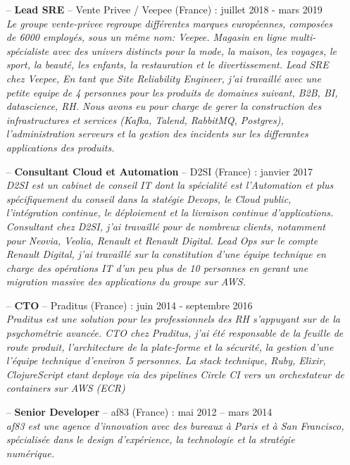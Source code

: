 \documentclass[a4paper,11pt]{article}
\begin{document}
  \begin{itemize}
    \item[--]
      \textbf{Lead SRE} – Vente Privee / Veepee (France) : juillet 2018 - mars 2019\\
      \textit{Le groupe vente-privee regroupe différentes marques européennes, composées de 6000 employés, sous un même nom: Veepee. Magasin en ligne multi-spécialiste avec des univers distincts pour la mode, la maison, les voyages, le sport, la beauté, les enfants, la restauration et le divertissement. Lead SRE chez Veepee, En tant que Site Reliability Engineer, j'ai travaillé avec une petite equipe de 4 personnes pour les produits de domaines suivant, B2B, BI, datascience, RH. Nous avons eu pour charge de gerer la construction des infrastructures et services (Kafka, Talend, RabbitMQ, Postgres), l'administration serveurs et la gestion des incidents sur les differantes applications des produits.}
    \item[--]
      \textbf{Consultant Cloud et Automation} – D2SI (France) : janvier 2017\\
      \textit{D2SI est un cabinet de conseil IT dont la spécialité est l'Automation et plus spécifiquement du conseil dans la statégie Devops, le Cloud public, l'intégration continue, le déploiement et la livraison continue d'applications. Consultant chez D2SI, j'ai travaillé pour de nombreux clients, notamment pour Neovia, Veolia, Renault et Renault Digital. Lead Ops sur le compte Renault Digital, j'ai travaillé sur la constitution d'une équipe technique en charge des opérations IT d'un peu plus de 10 personnes en gerant une migration massive des applications du groupe sur AWS.}
    \item[--]
      \textbf{CTO} – Praditus (France) : juin 2014 - septembre 2016\\
      \textit{Praditus est une solution pour les professionnels des RH s'appuyant sur de la psychométrie avancée. CTO chez Praditus, j'ai été responsable de la feuille de route produit, l'architecture de la plate-forme et la sécurité, la gestion d'une l'équipe technique d'environ 5 personnes. La stack technique, Ruby, Elixir, ClojureScript etant deploye via des pipelines Circle CI vers un orchestateur de containers sur AWS (ECR)}
    \item[--]
      \textbf{Senior Developer} – af83 (France) : mai 2012 – mars 2014\\
      \textit{af83 est une agence d'innovation avec des bureaux à Paris et à San Francisco, spécialisée dans le design d'expérience, la technologie et la stratégie numérique. \\}

\end{itemize}
\end{document}
